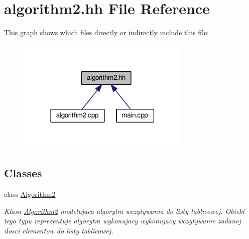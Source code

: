 \hypertarget{algorithm2_8hh}{}\section{algorithm2.\+hh File Reference}
\label{algorithm2_8hh}
This graph shows which files directly or indirectly include this file\+:\nopagebreak
\begin{figure}[H]
\begin{center}
\leavevmode
\includegraphics[width=234pt]{algorithm2_8hh__dep__incl}
\end{center}
\end{figure}
\subsection*{Classes}
\begin{DoxyCompactItemize}
\item 
class \hyperlink{class_algorithm2}{Algorithm2}
\begin{DoxyCompactList}\small\item\em Klasa \hyperlink{class_algorithm2}{Algorithm2} modelujaca algorytm wczytywania do listy tablicowej. Obiekt tego typu reprezentuje algorytm wykonujacy wykonujacy wczytywanie zadanej ilosci elementow do listy tablicowej. \end{DoxyCompactList}\end{DoxyCompactItemize}
